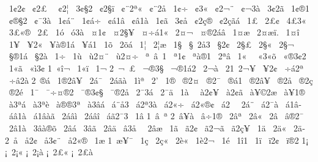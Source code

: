 {^^a01^^a22^^a2
^^a0^^a22^^a3^^a0
^^a0^^a22^^a6
^^a03^^a2^^a72
^^a0^^a22^^a7^^ef
^^a0^^a2^^a82^^aa^^ab
^^a0^^a2^^a82^^e5
^^a01^^a2^^f7
^^a0^^a23^^ab
^^a0^^a22^^ac^^a8
^^a0^^a2^^ac3^^e0
^^a03^^a22^^ad^^e3
^^a01^^a2^^ae1
^^a0^^a2^^ae^^a72
^^a0^^a2^^af3^^e0
^^a01^^a2^^e1^^a8
^^a01^^a2^^e1^^f7
^^a0^^a2^^e11^^e2
^^a0^^a2^^e21^^e0
^^a01^^a2^^e3
^^a03^^a2^^e5
^^a0^^a22^^e7^^ae
^^a0^^a22^^e7^^e3^^e1
^^a01^^a3
^^a02^^a3^^a2
^^a04^^a33^^ab^^a0
^^a03^^a3^^ab^^ae
^^a02^^a3^^ad
^^a01^^f3
^^a0^^f33^^e0
^^a0^^a41^^a2
^^a0^^a42^^a7^^a5
^^a0^^a4^^f7^^e11^^ab
^^a02^^a4^^ac
^^a0^^a4^^ae2^^e1^^e2
^^a01^^a4^^e6
^^a02^^a4^^e6^^ef.
^^a01^^a4^^ee
^^a01^^a5
^^a0^^a52^^ab
^^a0^^a5^^e0^^ae1^^e1
^^a0^^a5^^e11
^^a01^^f5
^^a02^^f5^^e1
^^a01^^a6
^^a02^^a6^^e6
^^a01^^a7
^^a0^^a7^^a02^^e53
^^a0^^a72^^a2
^^a02^^a7^^a3
^^a02^^a7^^ab
^^a02^^a7^^ac
^^a0^^a7^^ae1^^e1
^^a0^^a72^^e0
^^a01^^f7
^^a01^^f9
^^a0^^f92^^a4^^a8
^^a0^^f92^^a4^^f7
^^a0^^aa^^a0^^e2^^a01
^^a0^^aa1^^a2
^^a0^^aa^^e0^^ae1
^^a02^^aa^^e2
^^a01^^ab^^a0
^^a0^^ab3^^ab^^f5
^^a0^^ab^^ae3^^a22
^^a01^^ab^^e3
^^a0^^ab^^ec3^^a2
1^^a0^^ab^^ee^^ac
^^a01^^ab^^ef
^^a01^^ac
2^^a0^^ac^^a0^^a3
^^a0^^ac^^ae3^^a7
^^a0^^ac^^ae1^^e12
^^a02^^ac^^e0
^^a02^^ad1^^a02^^ac^^a5
^^a0^^ad^^a52^^a2
^^a0^^ad^^f7^^e12^^aa
^^a0^^ad^^f7^^e22^^e0
2^^a0^^ad^^ae^^e1
^^a0^^ad1^^ae2^^e2^^a5
^^a0^^ad2^^e1^^af
^^a0^^ad2^^e1^^e3^^e0
^^a01^^ad^^ec^^aa
^^a02^^ad'
^^a01^^ae
^^a0^^ae2^^a4
^^a0^^ae2^^af
^^a0^^ae^^e11
^^a0^^ae2^^e2^^a5
^^a0^^ae2^^e5
^^a0^^ae2^^e7
^^a0^^ae2^^e9
^^a01^^af
^^a0^^af^^f7^^a4^^ae2
^^a0^^af^^ae3^^a2^^a7
^^a0^^af^^ae2^^e5
^^a02^^af3^^e1
^^a02^^af^^e4
^^a01^^e0^^a0
^^a0^^e02^^a2^^a5
^^a0^^e02^^a2^^e3
^^a0^^e0^^a5^^a92^^e6
^^a0^^e0^^a51^^ae
^^a0^^e03^^aa^^e1
^^a0^^e03^^aa^^e8
^^a0^^e0^^ae^^ae3^^aa
^^a0^^e03^^e2^^e1
^^a0^^e1^^a8^^ad^^e53
^^a0^^e12^^aa3^^e0
^^a0^^e12^^ab^^f7
^^a0^^e12^^ab^^ae^^a2
^^a0^^e12^^ad^^a0
^^a02^^e1^^ad^^a8
^^a0^^e12^^af^^e0
^^a0^^e11^^e2^^ad
^^a0^^e1^^e21^^e0
^^a0^^e11^^e2^^e0^^e3
^^a02^^e1^^e2^^ec
^^a02^^e1^^e2^^ee
^^a0^^e1^^e32^^af3
^^a01^^e2
1^^a0^^e2^^a0^^aa
2^^a0^^e2^^a5^^e0
^^a0^^e2^^f71^^ae
^^a02^^e2^^aa
^^a02^^e2^^ab
^^a02^^e2^^ad
^^a0^^e2^^ae2^^af
^^a02^^e21^^e0
^^a03^^e2^^e0^^ae^^f5
^^a02^^e2^^e1
^^a03^^e2^^e3
^^a02^^e2^^e4
^^a0^^e23^^e5^^a0
^^a02^^e2^^e6
^^a01^^e3
^^a0^^e32^^a2
^^a0^^e32^^ac^^e3
^^a0^^e32^^e7^^a5
^^a01^^e4
^^a02^^e4^^ab
^^a02^^e4^^ad
2^^a0^^e5
^^a0^^e52^^a2
^^a0^^e53^^a2^^a8
^^a0^^e52^^ab^^ae
^^a01^^e6
1^^a0^^e6^^a5^^af
^^a01^^e7
^^a02^^e7^^ab
^^a02^^e8^^ab
^^a01^^e82^^ac
^^a01^^e9
^^a01^^ee1
^^a01^^ef
^^a0^^ef2^^a2
^^a0^^ef^^ad^^ae2
1^^a1^^a0
^^a1^^a02^^a1^^ab
^^a1^^a02^^a1^^e0
^^a1^^a02^^a3^^ab
^^a1^^a02^^a3^^e0
}
